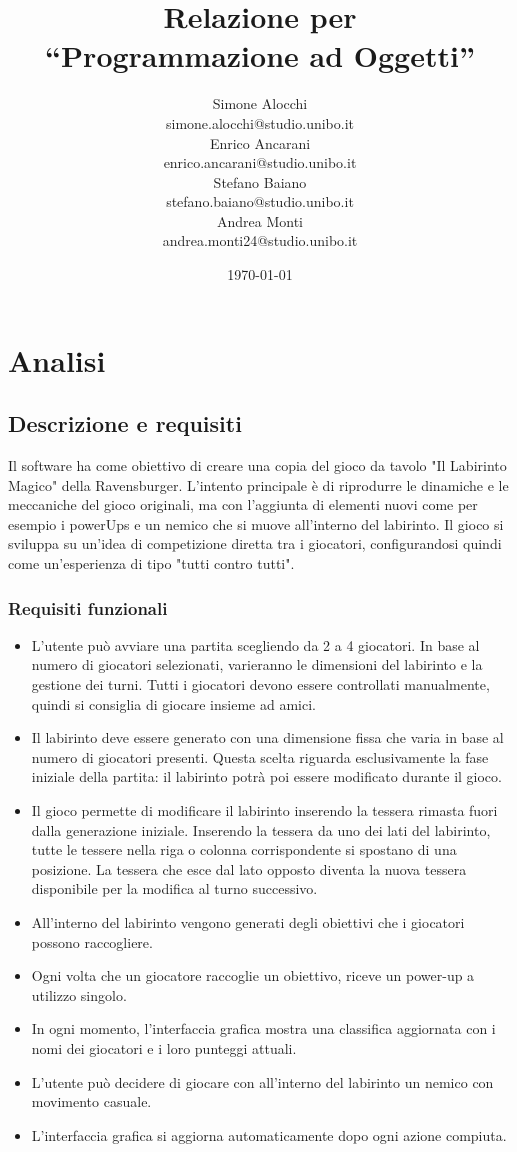 \documentclass[a4paper,12pt]{report}
\title{Relazione per\\``Programmazione ad Oggetti''}
\author{Simone Alocchi\\simone.alocchi@studio.unibo.it
\\Enrico Ancarani\\enrico.ancarani@studio.unibo.it
\\Stefano Baiano\\stefano.baiano@studio.unibo.it
\\Andrea Monti\\andrea.monti24@studio.unibo.it}
\date{\today}
\begin{document}
\maketitle

\tableofcontents

\chapter{Analisi}

\section{Descrizione e requisiti}

Il software ha come obiettivo di creare una copia del gioco da tavolo "Il Labirinto Magico" della Ravensburger.
%
L'intento principale è di riprodurre le dinamiche e le meccaniche del gioco
 originali, ma con l'aggiunta di elementi nuovi come per esempio i 
powerUps e un nemico che si muove all'interno del labirinto.
%
Il gioco si sviluppa su un'idea di competizione diretta tra i giocatori,
 configurandosi quindi come un'esperienza di tipo "tutti contro tutti".

\subsection*{Requisiti funzionali}
\begin{itemize}
	\item L’utente può avviare una partita scegliendo da 2 a 4 giocatori.
	In base al numero di giocatori selezionati, varieranno le dimensioni del labirinto e la gestione dei turni.
	Tutti i giocatori devono essere controllati manualmente, quindi si consiglia di giocare insieme ad amici.
	\item Il labirinto deve essere generato con una dimensione fissa che varia in base al numero di giocatori presenti.
	Questa scelta riguarda esclusivamente la fase iniziale della partita: il labirinto potrà poi essere modificato durante il gioco.
	\item Il gioco permette di modificare il labirinto inserendo la tessera rimasta fuori dalla generazione iniziale.
	Inserendo la tessera da uno dei lati del labirinto, tutte le tessere nella riga o colonna corrispondente si spostano di una posizione.
	La tessera che esce dal lato opposto diventa la nuova tessera disponibile per la modifica al turno successivo.
	\item All'interno del labirinto vengono generati degli obiettivi che i giocatori possono raccogliere.
	\item Ogni volta che un giocatore raccoglie un obiettivo, riceve un power-up a utilizzo singolo.
	\item In ogni momento, l’interfaccia grafica mostra una classifica aggiornata con i nomi dei giocatori e i loro punteggi attuali.
	\item L'utente può decidere di giocare con all'interno del labirinto un nemico con movimento casuale.
	\item L’interfaccia grafica si aggiorna automaticamente dopo ogni azione compiuta.
\end{itemize}
\end{document}
